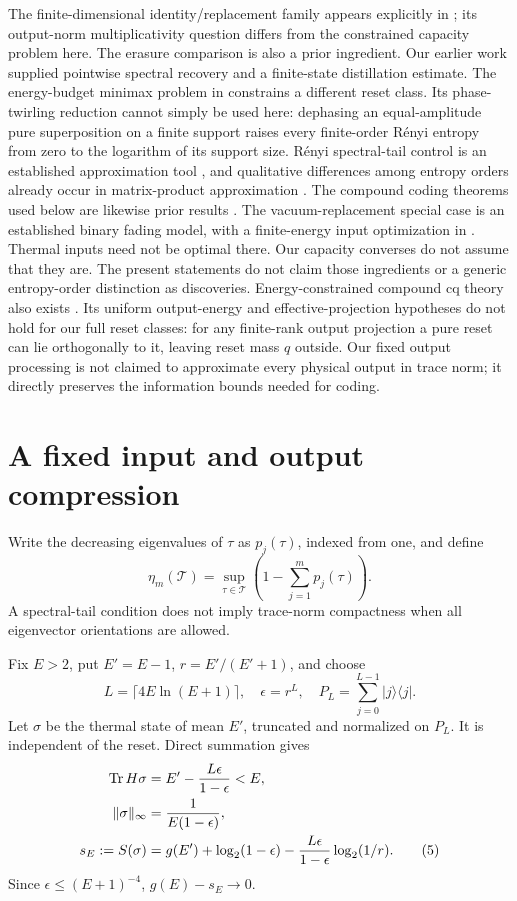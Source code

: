 \documentclass[11pt]{article}
\newcommand{\Tr}{\operatorname{Tr}}
\newcommand{\Tcal}{\mathcal T}
\begin{document}
The finite-dimensional identity/replacement family appears explicitly in
\cite[Eq.~(34)]{glr}; its output-norm multiplicativity question differs
from the constrained capacity problem here. The erasure comparison is also
a prior ingredient. Our earlier work \cite{prior} supplied pointwise spectral
recovery and a finite-state distillation estimate.
The energy-budget minimax problem in \cite{minimax} constrains a different
reset class. Its phase-twirling reduction cannot simply be used here:
dephasing an equal-amplitude pure superposition on a finite support
raises every finite-order R\'enyi entropy
from zero to the logarithm of its support size.
R\'enyi spectral-tail control is an established approximation tool
\cite{vc}, and qualitative differences among entropy orders already
occur in matrix-product approximation \cite{schuch}.
The compound coding theorems used below are likewise prior results
\cite{cq,quantumcompound,eacompound}.
The vacuum-replacement special case is an established binary fading
model, with a finite-energy input optimization in
\cite[Section IV and Appendix C]{catalano}. Thermal inputs need not be
optimal there. Our capacity converses do not assume that they are.
The present statements do not claim those ingredients or a generic
entropy-order distinction as discoveries.
Energy-constrained compound cq theory also exists \cite[Theorem 5]{cnr}.
Its uniform output-energy and effective-projection hypotheses do not hold
for our full reset classes: for any finite-rank output projection a pure
reset can lie orthogonally to it, leaving reset mass \(q\) outside.
Our fixed output processing is not claimed to approximate every physical
output in trace norm; it directly preserves the information bounds needed
for coding.

\section{A fixed input and output compression}
Write the decreasing eigenvalues of \(\tau\) as \(p_j(\tau)\), indexed
from one, and define
\[
 \eta_m(\Tcal)=\sup_{\tau\in\Tcal}
       \left(1-\sum_{j=1}^m p_j(\tau)\right).
\]
A spectral-tail condition does not imply trace-norm compactness when
all eigenvector orientations are allowed.

Fix \(E>2\), put \(E'=E-1\), \(r=E'/(E'+1)\), and choose
\[
 L=\lceil4E\ln(E+1)\rceil,\quad \epsilon=r^L,\quad
 P_L=\sum_{j=0}^{L-1}|j\rangle\langle j|.
\]
Let \(\sigma\) be the thermal state of mean \(E'\), truncated and
normalized on \(P_L\). It is independent of the reset. Direct summation gives
\begin{align}
 \Tr H\sigma&=E'-\frac{L\epsilon}{1-\epsilon}<E,\notag\\
 \|\sigma\|_\infty&=\frac{1}{E(1-\epsilon)},\notag\\
 s_E:=S(\sigma)&=g(E')+\log_2(1-\epsilon)
       -\frac{L\epsilon}{1-\epsilon}\log_2(1/r).                 \tag{5}
\end{align}
Since \(\epsilon\le(E+1)^{-4}\), \(g(E)-s_E\to0\).
\end{document}
